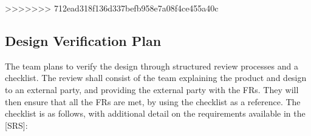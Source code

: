 \documentclass[12pt, titlepage]{article}
\begin{document}

>>>>>>> 712ead318f136d337befb958e7a08f4ce455a40c

\subsection{Design Verification Plan}

The team plans to verify the design through structured review processes and a checklist. The review shall consist of the team explaining the product and design to an external party, and providing the external party with the FRs. They will then ensure that all the FRs are met, by using the checklist as a reference. The checklist is as follows, with additional detail on the requirements available in the [SRS]: 
\end{document}
